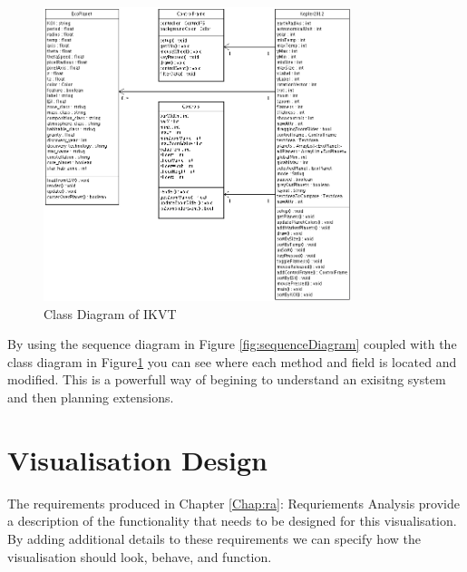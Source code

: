 \begin{enumerate}
\begin{figure}[H]
      \includegraphics[width=0.8\textwidth]{images/classDiagram.png}
  \caption{Class Diagram of IKVT}  
  \label{fig:classDiagram}
\end{figure}
\end{enumerate}

By using
the sequence diagram in Figure \ref{fig:sequenceDiagram} coupled with the class
diagram in Figure\ref{fig:classDiagram} you can see where each method and field
is located and modified. This is a powerfull way of begining to understand an
exisitng system and then planning extensions.

\section{Visualisation Design}
The requirements produced in Chapter \ref{Chap:ra}: Requriements Analysis
provide a
description of the functionality that needs to be designed for this
visualisation. By adding additional details to these requirements we can specify
how the visualisation should look, behave, and function.

\clearpage
